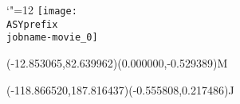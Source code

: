 \setlength{\unitlength}{1pt}%
\makeatletter%
\let\ASYencoding\f@encoding%
\let\ASYfamily\f@family%
\let\ASYseries\f@series%
\let\ASYshape\f@shape%
\makeatother%
{\catcode`"=12%
\texttt{[image: \\ASYprefix\\jobname-movie\_0]}%
}%
%
%
\fontsize{12.000000}{14.400000}\selectfont%
\usefont{\ASYencoding}{\ASYfamily}{\ASYseries}{\ASYshape}%
\ASYalign(-12.853065,82.639962)(0.000000,-0.529389){M}%
%
%
\fontsize{12.000000}{14.400000}\selectfont%
\ASYalign(-118.866520,187.816437)(-0.555808,0.217486){J}%
